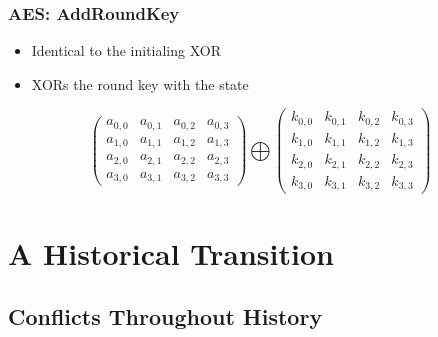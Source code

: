 \documentclass[12pt]{beamer}
\begin{document}
\begin{frame}
\frametitle{AES: AddRoundKey}
\begin{itemize}
\item Identical to the initialing XOR
\item XORs the round key with the state
\end{itemize}
\begin{center}
\[ 
\left( \begin{array}{cccc}
a_{0,0} & a_{0,1} & a_{0,2} & a_{0,3} \\
a_{1,0} & a_{1,1} & a_{1,2} & a_{1,3} \\
a_{2,0} & a_{2,1} & a_{2,2} & a_{2,3} \\
a_{3,0} & a_{3,1} & a_{3,2} & a_{3,3}\end{array} \right)
\bigoplus
\left( \begin{array}{cccc}
k_{0,0} & k_{0,1} & k_{0,2} & k_{0,3} \\
k_{1,0} & k_{1,1} & k_{1,2} & k_{1,3} \\
k_{2,0} & k_{2,1} & k_{2,2} & k_{2,3} \\
k_{3,0} & k_{3,1} & k_{3,2} & k_{3,3}\end{array} \right)
\]
\end{center}
\end{frame}

\section{A Historical Transition}

\subsection{Conflicts Throughout History}
\end{document}
